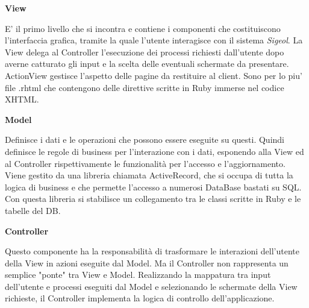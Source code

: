\documentclass[11pt,a4paper]{article}
\begin{document}
\begin{center}
 \textbf{View}
\end{center}
E' il primo livello che si incontra e contiene i componenti che costituiscono l'interfaccia grafica, tramite la quale l'utente interagisce con il sistema \textit{Sigeol}.
La View delega al Controller l'esecuzione dei processi richiesti dall'utente dopo averne catturato gli input e la
scelta delle eventuali schermate da presentare.
ActionView gestisce l'aspetto delle pagine da restituire al client. Sono per lo piu' file .rhtml che contengono delle direttive scritte in Ruby immerse nel codice XHTML.

\begin{center}
 \textbf{Model}
\end{center}
Definisce i dati e le operazioni che possono essere eseguite su questi. Quindi definisce le regole di business per l'interazione con i dati, esponendo alla View ed al Controller rispettivamente le funzionalità per l'accesso e l'aggiornamento.
Viene gestito da una libreria chiamata ActiveRecord, che si occupa di tutta la logica di business e che permette l'accesso a numerosi DataBase bastati su SQL. Con questa libreria si stabilisce un collegamento tra le classi scritte in Ruby e le tabelle del DB.

\begin{center}
 \textbf{Controller}
\end{center}
Questo componente ha la responsabilità di trasformare le interazioni dell'utente della View in azioni eseguite dal Model. Ma il Controller non rappresenta un semplice "ponte" tra View e Model. Realizzando la mappatura tra input dell'utente e processi eseguiti dal Model e selezionando le schermate della View richieste, il Controller implementa la logica di controllo dell'applicazione.
\end{document}
